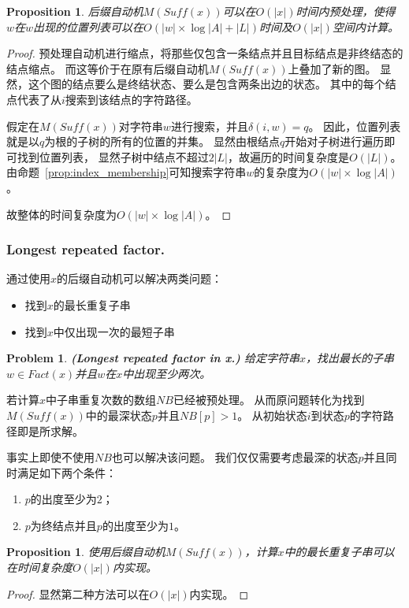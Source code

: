 \documentclass[UTF8]{ctexart}
\newtheorem{prop}[thm]{Proposition}
\newtheorem{prob}[thm]{Problem}
\theoremstyle{definition}
\theoremstyle{remark}
\numberwithin{equation}{subsection}
\newcommand{\Emph}{\textbf}
\newcommand{\Suff}{\textit{Suff}}
\begin{document}
	\begin{prop}
		后缀自动机$M(\Suff(x))$可以在$O(|x|)$时间内预处理，使得
		$w$在$w$出现的位置列表可以在$O(|w| \times \log |A| + |L|)$时间及$O(|x|)$空间内计算。
	\end{prop}
	\begin{proof}
		预处理自动机进行缩点，将那些仅包含一条结点并且目标结点是非终结态的结点缩点。
		而这等价于在原有后缀自动机$M(\Suff(x))$上叠加了新的图。
		显然，这个图的结点要么是终结状态、要么是包含两条出边的状态。
		其中的每个结点代表了从$i$搜索到该结点的字符路径。
		
		假定在$M(\Suff(x))$对字符串$w$进行搜索，并且$\delta(i, w) = q$。
		因此，位置列表就是以$q$为根的子树的所有的位置的并集。
		显然由根结点$q$开始对子树进行遍历即可找到位置列表，
		显然子树中结点不超过$2|L|$，故遍历的时间复杂度是$O(|L|)$。
		由命题~\ref{prop:index_membership}可知搜索字符串$w$的复杂度为$O(|w| \times \log |A|)$。
		
		故整体的时间复杂度为$O(|w| \times \log |A|)$。
	\end{proof}
	
\subsubsection{Longest repeated factor.}
\label{subsub:idx_lrf}
	
	通过使用$x$的后缀自动机可以解决两类问题：
	\begin{itemize}
		\item 找到$x$的最长重复子串
		\item 找到$x$中仅出现一次的最短子串
	\end{itemize}
	
	\begin{prob}
		\Emph{(Longest repeated factor in x.)}
		给定字符串$x$，找出最长的子串$w \in Fact(x)$并且$w$在$x$中出现至少两次。
	\end{prob}
	若计算$x$中子串重复次数的数组$NB$已经被预处理。
	从而原问题转化为找到$M(\Suff(x))$中的最深状态$p$并且$NB[p]>1$。
	从初始状态$i$到状态$p$的字符路径即是所求解。
	
	事实上即使不使用$NB$也可以解决该问题。
	我们仅仅需要考虑最深的状态$p$并且同时满足如下两个条件：
	\begin{enumerate}[(1)]
		\item $p$的出度至少为$2$；
		\item $p$为终结点并且$p$的出度至少为$1$。
	\end{enumerate}
	
	\begin{prop}
	\label{prop:idx_lrf_complex}
		使用后缀自动机$M(\Suff(x))$，计算$x$中的最长重复子串可以在时间复杂度$O(|x|)$内实现。
	\end{prop}
	\begin{proof}
		显然第二种方法可以在$O(|x|)$内实现。
	\end{proof}
	
\end{document}
